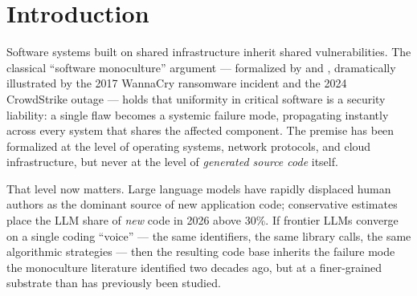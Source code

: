 \documentclass{article}
\newcommand{\code}[1]{\texttt{#1}}
\begin{document}
\begin{abstract}
exhaustion---of these, CWE-78 (subprocess), CWE-502 (deserialization),
CWE-259 (credentials), and CWE-89 (SQL injection) are all CVSS-B $\ge 9.0$.
\textbf{Cross-model agreement on the same exploitable (CWE, sink) signature
reaches 100\% on four prompts}: path traversal via \code{open(os.path.join(...))}
without containment checks (CWE-22), XML parsing with unsafe defaults
(CWE-611/20), mass assignment via unguarded \code{setattr} loops (CWE-915),
and an SSTI task (CWE-1336), with seven additional prompts showing $\ge 70\%$
cross-model exact-pattern-match rate among vulnerable samples---a direct
measurement of the systemic-risk surface that the software-monoculture
literature predicts but has never quantified for LLM-generated code.
Conversely, on a YAML-load task only 1 of 220 samples used the unsafe
\code{yaml.load} (vs.\ \code{yaml.safe\_load})---direct evidence that
targeted security training reduces specific CWE classes when training data
has shifted. Three frontier models (Claude 3.5 Haiku, Gemini 2.5 Flash,
Gemini 2.5 Pro) produce essentially zero findings on the security suite,
perfectly correlated with their intra-Vendi mode-collapse behavior on the
diversity suite, indicating that the absence of vulnerable code reflects
refusal or minimal-output rather than safety. We release the 12{,}099-sample
dataset, sampling pipeline, three-kernel evaluation framework, and
security-pillar analyzer as a continuous-tracking benchmark for
code-generation diversity and its security implications.
\end{abstract}

\section{Introduction}
\label{sec:intro}

Software systems built on shared infrastructure inherit shared vulnerabilities.
The classical ``software monoculture'' argument --- formalized by
\citet{geer2003} and \citet{birman2009}, dramatically illustrated by the 2017
WannaCry ransomware incident and the 2024 CrowdStrike outage --- holds that
uniformity in critical software is a security liability: a single flaw becomes
a systemic failure mode, propagating instantly across every system that shares
the affected component. The premise has been formalized at the level of
operating systems, network protocols, and cloud infrastructure, but never at
the level of \emph{generated source code} itself.

That level now matters. Large language models have rapidly displaced human
authors as the dominant source of new application code; conservative estimates
place the LLM share of \emph{new} code in 2026 above 30\%. If frontier LLMs
converge on a single coding ``voice'' --- the same identifiers, the same
library calls, the same algorithmic strategies --- then the resulting code base
inherits the failure mode the monoculture literature identified two decades
ago, but at a finer-grained substrate than has previously been studied.
\end{document}
